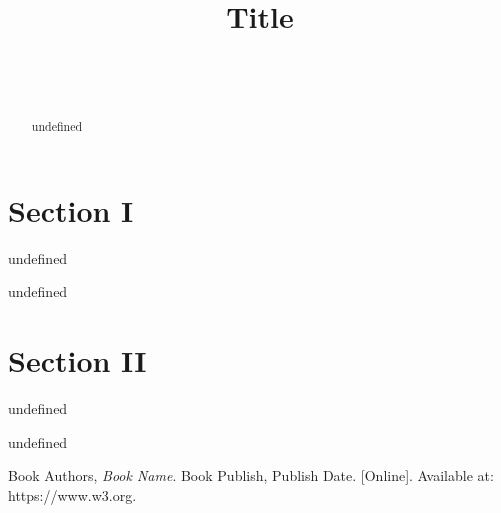 \documentclass[10pt, draftclsnofoot, onecolumn]{IEEEtran}
\title{
	{\fontseries{bx}\fontsize{48pt}{48pt}\selectfont Title}\\
	\vspace{0.25 in}
	{\fontseries{b}\fontsize{16pt}{16pt}\selectfont {Subtitle}}
}
\author{\vfill \name\\\class\\\term}
\begin{document}
\maketitle
{}
\newpage
{}
\justify
\begin{abstract}
\noindent undefined\\
\end{abstract}

\begin{multicols}{2}
\section*{\selectfont Section I}
\noindent undefined
\\\par
\noindent undefined

\section*{\selectfont Section II}
\noindent undefined
\\\par
\noindent undefined

\begin{thebibliography}{9}
 Book Authors, \textit{Book Name}. Book Publish, Publish Date. [Online]. Available at: https://www.w3.org.
\end{thebibliography}
\end{multicols}
\end{document}
